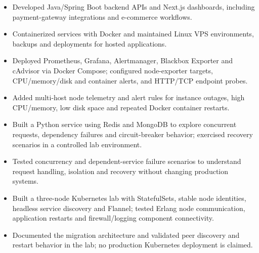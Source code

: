 \begin{itemize}
\item Developed Java/Spring Boot backend APIs and Next.js dashboards, including
payment-gateway integrations and e-commerce workflows.
\item Containerized services with Docker and maintained Linux VPS environments,
backups and deployments for hosted applications.
\end{itemize}

\newpage
{}
\begin{itemize}
\item Deployed Prometheus, Grafana, Alertmanager, Blackbox Exporter and cAdvisor
via Docker Compose; configured node-exporter targets, CPU/memory/disk and
container alerts, and HTTP/TCP endpoint probes.
\item Added multi-host node telemetry and alert rules for instance outages, high
CPU/memory, low disk space and repeated Docker container restarts.
\end{itemize}

\begin{itemize}
\item Built a Python service using Redis and MongoDB to explore concurrent requests,
dependency failures and circuit-breaker behavior; exercised recovery scenarios
in a controlled lab environment.
\item Tested concurrency and dependent-service failure scenarios to understand
request handling, isolation and recovery without changing production systems.
\end{itemize}

\begin{itemize}
\item Built a three-node Kubernetes lab with StatefulSets, stable node identities,
headless service discovery and Flannel; tested Erlang node communication,
application restarts and firewall/logging component connectivity.
\item Documented the migration architecture and validated peer discovery and
restart behavior in the lab; no production Kubernetes deployment is claimed.
\end{itemize}

